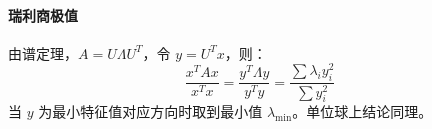 \paragraph{瑞利商极值}  
由谱定理，\( A = U \Lambda U^T \)，令 \( y = U^T x \)，则：
\[
\frac{x^T A x}{x^T x} = \frac{y^T \Lambda y}{y^T y} = \frac{\sum \lambda_i y_i^2}{\sum y_i^2}
\]
当 \( y \) 为最小特征值对应方向时取到最小值 \( \lambda_{\min} \)。单位球上结论同理。
